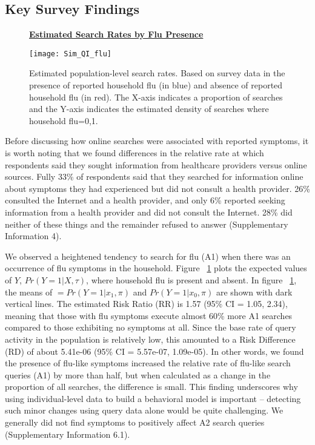 \documentclass[fleqn,10pt]{wlscirep}
\begin{document}
\subsection*{Key Survey Findings}

\begin{figure}%
\centering
\textbf{\underline{Estimated Search Rates by Flu Presence}}\par\medskip
\texttt{[image: Sim\_QI\_flu]}
\caption{Estimated population-level search rates. Based on survey data in the presence of reported household flu (in blue) and absence of reported household flu (in red). The X-axis indicates a proportion of searches and the Y-axis indicates the estimated density of searches where household flu=0,1.}
\label{fig:A1search}
\end{figure}

Before discussing how online searches were associated with reported symptoms, it is worth noting that we found differences in the relative rate at which respondents said they sought information from healthcare providers versus online sources. Fully 33\% of respondents said that they searched for information online about symptoms they had experienced but did not consult a health provider. 26\% consulted the Internet and a health provider, and only 6\% reported seeking information from a health provider and did not consult the Internet. 28\% did neither of these things and the remainder refused to answer (Supplementary Information 4). 

We observed a heightened tendency to search for flu (A1) when there was an occurrence of flu symptoms in the household. Figure ~\ref{fig:A1search} plots the expected values of $Y$, $Pr(Y=1|X, \tau)$, where household flu is present and absent. In figure ~\ref{fig:A1search}, the means of $ = Pr(Y=1|x_1, \pi)$ and $ Pr(Y=1|x_0, \pi) $ are shown with dark vertical lines. The estimated Risk Ratio (RR) is 1.57 (95\% CI = 1.05, 2.34), meaning that those with flu symptoms execute almost 60\% more A1 searches compared to those exhibiting no symptoms at all. Since the base rate of query activity in the population is relatively low, this amounted to a Risk Difference (RD) of about 5.41e-06 (95\% CI = 5.57e-07, 1.09e-05). In other words, we found the presence of flu-like symptoms increased the relative rate of flu-like search queries (A1) by more than half, but when calculated as a change in the proportion of all searches, the difference is small. This finding underscores why using individual-level data to build a behavioral model is important -- detecting such minor changes using query data alone would be quite challenging. We generally did not find symptoms to positively affect A2 search queries (Supplementary Information 6.1).
\end{document}

